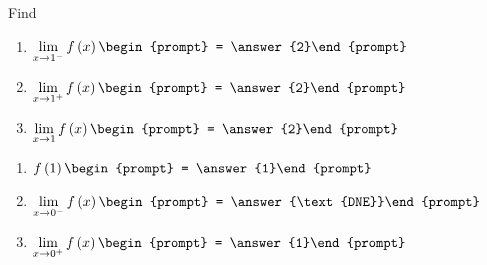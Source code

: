 \documentclass{ximera}
\begin{document}
\begin{exercise}
Find
\noindent\begin{minipage}[t]{.5\linewidth}
\begin{enumerate}
\item		$\lim_{x\to 1^-} f\p{x}\begin{prompt} = \answer{2}\end{prompt}$
\item		$\lim_{x\to 1^+} f\p{x}\begin{prompt} = \answer{2}\end{prompt}$
\item		$\lim_{x\to 1} f\p{x}\begin{prompt} = \answer{2}\end{prompt}$
\end{enumerate}
\end{minipage}
\noindent\begin{minipage}[t]{.5\linewidth}
\begin{enumerate}\addtocounter{enumii}{3}
\item		$f\p{1}\begin{prompt} = \answer{1}\end{prompt}$
\item		$\lim_{x\to 0^-} f\p{x}\begin{prompt} = \answer{\text{DNE}}\end{prompt}$
\item		$\lim_{x\to 0^+} f\p{x}\begin{prompt} = \answer{1}\end{prompt}$
\end{enumerate}
\end{minipage}

\end{exercise}
\end{document}
